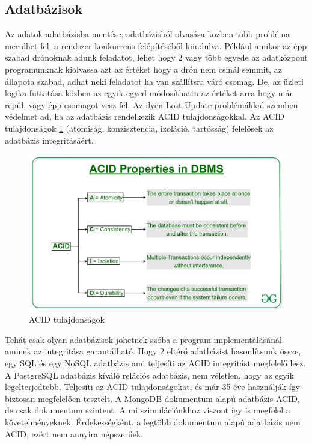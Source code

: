 \subsection{Adatbázisok}
Az adatok adatbázisba mentése, adatbázisból olvasása közben több probléma merülhet fel, a rendszer konkurrens felépítéséből kiindulva.
Például amikor az épp szabad drónoknak adunk feladatot, lehet hogy 2 vagy több egyede az adatközpont programunknak kiolvassa azt az értéket hogy a drón nem csinál semmit, az állapota szabad, adhat neki feladatot ha van szállítsra váró csomag.
De, az üzleti logika futtatása közben az egyik egyed módosíthatta
az értéket arra hogy már repül, vagy épp csomagot vesz fel.
Az ilyen Lost Update problémákkal szemben védelmet ad, ha az adatbázis rendelkezik ACID tulajdonságokkal.
Az ACID tulajdonságok \ref{fig:acid} (atomiság, konzisztencia, izoláció, tartósság) felelősek az adatbázis integritásáért.

\begin{figure}[h]
    \centering
    \includegraphics[scale=0.15]{images/ACID-Properties.jpg}
    \caption{ACID tulajdonságok}
    \label{fig:acid}
\end{figure}

Tehát csak olyan adatbázisok jöhetnek szóba a program implementálásánál aminek az integritása garantálható.
Hogy 2 eltérő adatbázist hasonlítsunk össze, egy SQL és egy NoSQL adatbázis ami teljesíti az ACID integritást megfelelő lesz.
A PostgreSQL adatbázis kíváló relációs adatbázis, nem véletlen, hogy az egyik legelterjedtebb. Teljesíti az ACID tulajdonságokat, és már 35 éve használják így biztosan megfelelően tesztelt.
A MongoDB dokumentum alapú adatbázis ACID, de csak dokumentum szintent. A mi szimulációnkhoz viszont így is megfelel a követelményeknek.
Érdekességként, a legtöbb dokumentum alapú adatbázis nem ACID, ezért nem annyira népszerűek.


